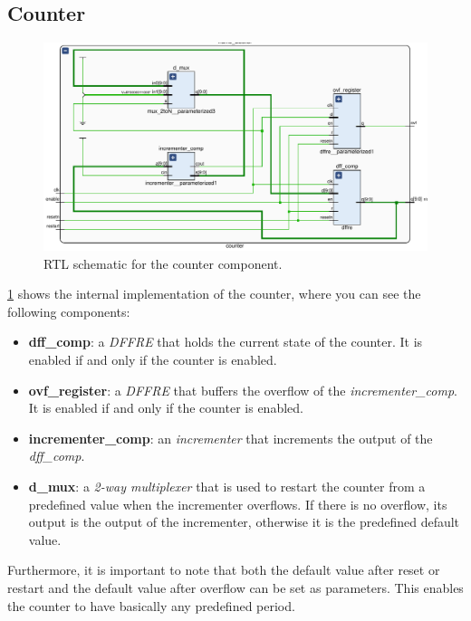\subsection{Counter}
\begin{figure}[]
  \centering
  \includegraphics[width=\textwidth]{figs/counter_schematic.pdf}
  \caption{RTL schematic for the counter component.}
  \label{fig:counter}
\end{figure}

\cref{fig:counter} shows the internal implementation of the counter, where you
can see the following components:
\begin{itemize}
  \item \textbf{dff\_comp}: a \emph{DFFRE} that holds the current state of the
    counter. It is enabled if and only if the counter is enabled.
  \item \textbf{ovf\_register}: a \emph{DFFRE} that buffers the overflow of the
    \emph{incrementer\_comp}. It is enabled if and only if the counter is enabled.
  \item \textbf{incrementer\_comp}: an \emph{incrementer} that increments the
    output of the \emph{dff\_comp}.
  \item \textbf{d\_mux}: a \emph{2-way multiplexer} that is used to restart the
    counter from a predefined value when the incrementer overflows. If there is
    no overflow, its output is the output of the incrementer, otherwise it is
    the predefined default value.
\end{itemize}

Furthermore, it is important to note that both the default value after reset
or restart and the default value after overflow can be set as parameters.
This enables the counter to have basically any predefined period.

